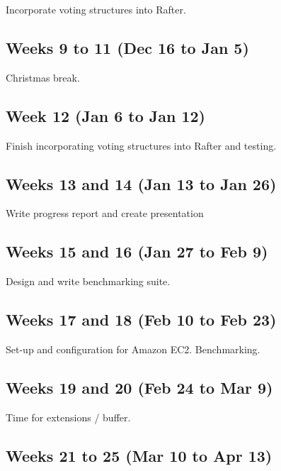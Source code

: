 \documentclass[12pt]{scrartcl}
\begin{document}
Incorporate voting structures into Rafter.


\subsection{Weeks 9 to 11 (Dec 16 to Jan 5)%
  \label{weeks-9-to-11-dec-16-to-jan-5}%
}

Christmas break.


\subsection{Week 12 (Jan 6 to Jan 12)%
  \label{week-12-jan-6-to-jan-12}%
}

Finish incorporating voting structures into Rafter and testing.


\subsection{Weeks 13 and 14 (Jan 13 to Jan 26)%
  \label{weeks-13-and-14-jan-13-to-jan-26}%
}

Write progress report and create presentation


\subsection{Weeks 15 and 16 (Jan 27 to Feb 9)%
  \label{weeks-15-and-16-jan-27-to-feb-9}%
}

Design and write benchmarking suite.


\subsection{Weeks 17 and 18 (Feb 10 to Feb 23)%
  \label{weeks-17-and-18-feb-10-to-feb-23}%
}

Set-up and configuration for Amazon EC2. Benchmarking.


\subsection{Weeks 19 and 20 (Feb 24 to Mar 9)%
  \label{weeks-19-and-20-feb-24-to-mar-9}%
}

Time for extensions / buffer.


\subsection{Weeks 21 to 25 (Mar 10 to Apr 13)%
  \label{weeks-21-to-25-mar-10-to-apr-13}%
}
\end{document}
